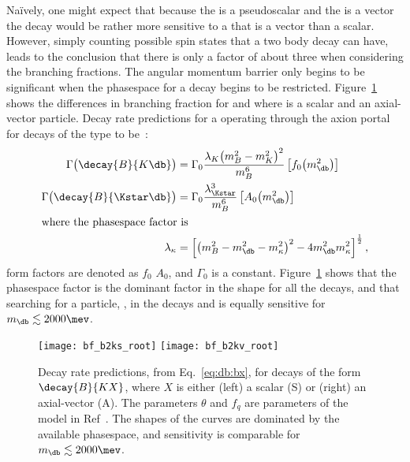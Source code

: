Na\"{i}vely, one might expect that because the \Bp is a pseudoscalar and the \Kstarz is a vector
the decay \btokstrdb would be rather more sensitive to a \db that is a vector than a scalar.
However, simply counting possible spin states that a two body decay can have, leads to the
conclusion that there is only a factor of about three when considering the branching fractions.
The angular momentum barrier only begins to be significant when the phasespace for a decay begins
to be restricted.
Figure~\ref{fig:db:kx} shows the differences in branching fraction for \btokstrdb and
\decay{\Bp}{\Kp\db} where \db is a scalar and an axial-vector particle.
Decay rate predictions for a \db operating through the axion portal for decays of the type
 to be~\cite{Batell:2009jf}:
\begin{align}
  \Gamma\big(\decay{B}{K\db}\big) &= \Gamma_0
  \frac{\lambda_{K}\big(m_{B}^2-m_{K}^2\big)^2}{m_{B}^6}
  \left[f_0\!\left(m_\db^2\right)\right]
  \\
  \Gamma\big(\decay{B}{\Kstar\db}\big) &= \Gamma_0
  \frac{\lambda_{\Kstar}^3}{m_{B}^6}
  \left[A_0\!\left(m_\db^2\right)\right]
  \\
  \intertext{where the phasespace factor is}
  \lambda_\kappa &= \left[
    \left( m_B^2 - m_\db^2 - m_\kappa^2 \right)^2
    -4m_\db^2m_\kappa^2
    \right]^\frac12,
    \label{eq:db:bx}
\end{align}
form factors are denoted as $f_0$ $A_0$, and $\Gamma_0$  is a constant.
Figure~\ref{fig:db:kx} shows that the phasespace factor is the dominant factor in the shape for all
the decays, and that searching for a particle, \db, in the decays \decay{\Bd}{\Kstarz\db} and
\decay{\Bp}{\Kp\db} is equally sensitive for $m_\db\lesssim2000\mev$.

\begin{figure}
  \begin{center}
    \texttt{[image: bf\_b2ks\_root]}
    \texttt{[image: bf\_b2kv\_root]}
    \caption{
      Decay rate predictions, from Eq.~\protect\ref{eq:db:bx},
      for decays of the form $\decay{B}{KX}$, where $X$ is either
      (left) a scalar (S) or
      (right) an axial-vector (A).
      The parameters $\theta$ and $f_q$ are parameters of the model in
      Ref~\cite{Batell:2009jf}.
      The shapes of the curves are dominated by the available phasespace, and sensitivity is
      comparable for $m_\db\lesssim2000\mev$.
    }
    \label{fig:db:kx}
  \end{center}
\end{figure}





